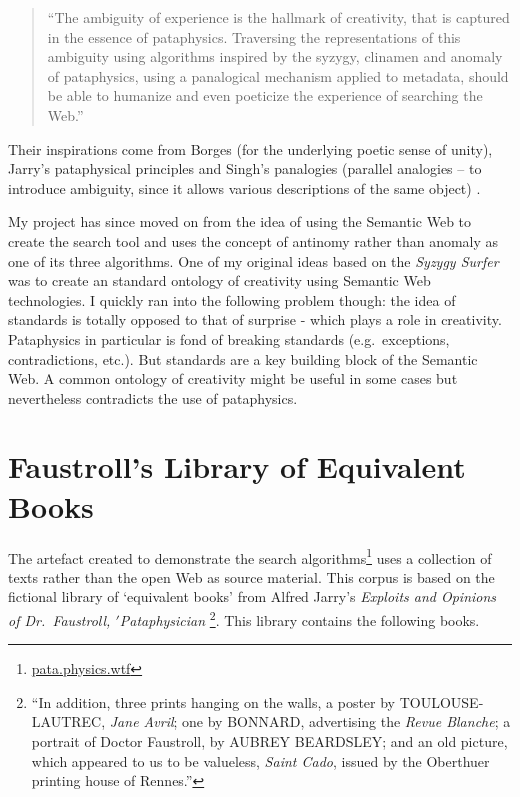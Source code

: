 \begin{quotation}
  ``The ambiguity of experience is the hallmark of creativity, that is captured in the essence of pataphysics. Traversing the representations of this ambiguity using algorithms inspired by the syzygy, clinamen and anomaly of pataphysics, using a panalogical mechanism applied to metadata, should be able to humanize and even poeticize the experience of searching the Web.'' 
\end{quotation}

Their inspirations come from Borges \autocite{Borges2000} (for the underlying poetic sense of unity), Jarry's pataphysical principles \autocite{Jarry1996} and Singh's panalogies (parallel analogies – to introduce ambiguity, since it allows various descriptions of the same object) \autocite{Singh2005}.

My project has since moved on from the idea of using the Semantic Web to create the search tool and uses the concept of antinomy rather than anomaly as one of its three algorithms. One of my original ideas based on the \textit{Syzygy Surfer} was to create an standard ontology of creativity using Semantic Web technologies. I quickly ran into the following problem though: the idea of standards is totally opposed to that of surprise - which plays a role in creativity. Pataphysics in particular is fond of breaking standards (e.g.\ exceptions, contradictions, etc.). But standards are a key building block of the Semantic Web. A common ontology of creativity might be useful in some cases but nevertheless contradicts the use of pataphysics.


\section{Faustroll's Library of Equivalent Books}
\label{s:faustlib}

The artefact created to demonstrate the search algorithms\footnote{\url{pata.physics.wtf}} uses a collection of texts rather than the open Web as source material. This corpus is based on the fictional library of `equivalent books' from Alfred Jarry's \emph{Exploits and Opinions of Dr.\ Faustroll, $'$Pataphysician} \citeyear[p.10-12]{Jarry1996}\footnote{``In addition, three prints hanging on the walls, a poster by TOULOUSE-LAUTREC, \emph{Jane Avril}; one by BONNARD, advertising the \emph{Revue Blanche}; a portrait of Doctor Faustroll, by AUBREY BEARDSLEY\@; and an old picture, which appeared to us to be valueless, \emph{Saint Cado}, issued by the Oberthuer printing house of Rennes.''\parencite[p.12]{Jarry1996}}. This library contains the following books.

